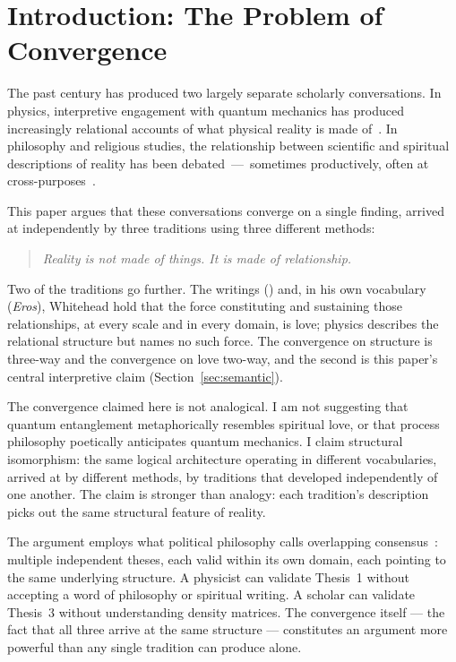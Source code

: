 
\section{Introduction: The Problem of Convergence}
\label{sec:intro}

The past century has produced two largely separate scholarly conversations.
In physics, interpretive engagement with quantum mechanics has produced
increasingly relational accounts of what physical reality is made
of~\citep{Rovelli2021,Bohm1980}.
In philosophy and religious studies, the relationship between scientific and
spiritual descriptions of reality has been debated~---~sometimes productively,
often at cross-purposes~\citep{Barbour2000,Polkinghorne1998}.

This paper argues that these conversations converge on a single finding,
arrived at independently by three traditions using three different methods:
\begin{quote}
\textit{Reality is not made of things. It is made of relationship.}
\end{quote}
Two of the traditions go further. The \bahai writings (\mahabbat) and,
in his own vocabulary (\emph{Eros}), Whitehead hold that the force
constituting and sustaining those relationships, at every scale and in
every domain, is love; physics describes the relational structure but
names no such force. The convergence on structure is
three-way and the convergence on love two-way, and the second is this
paper's central interpretive claim (Section~\ref{sec:semantic}).

The convergence claimed here is not analogical.
I am not suggesting that quantum entanglement metaphorically resembles
spiritual love, or that process philosophy poetically anticipates quantum
mechanics.
I claim structural isomorphism: the same logical architecture operating
in different vocabularies, arrived at by different methods, by traditions
that developed independently of one another.
The claim is stronger than analogy: each tradition's description picks out
the same structural feature of reality.

The argument employs what political philosophy calls overlapping
consensus~\citep{Rawls1993}: multiple independent theses, each valid
within its own domain, each pointing to the same underlying structure.
A physicist can validate Thesis~1 without accepting a word of philosophy
or spiritual writing.
A \bahai scholar can validate Thesis~3 without understanding density matrices.
The convergence itself --- the fact that all three arrive at the same structure
--- constitutes an argument more powerful than any single tradition can produce alone.

